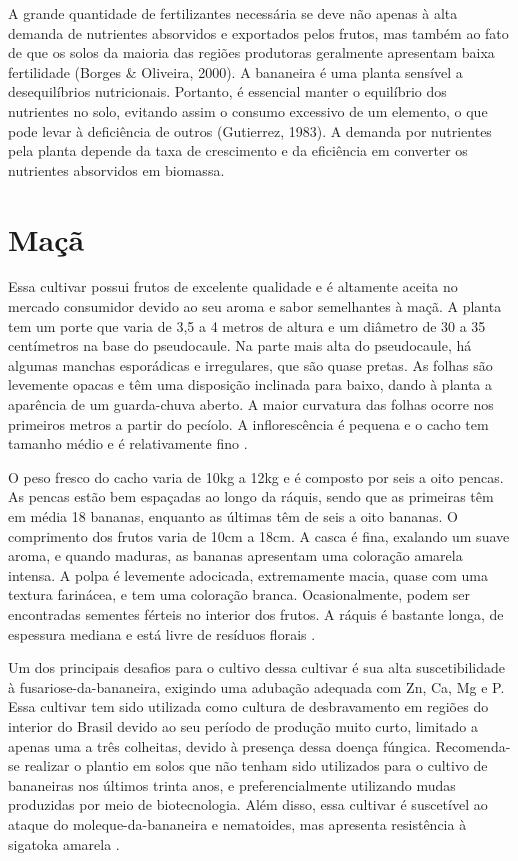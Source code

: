 A grande quantidade de fertilizantes necessária se deve não apenas à alta demanda de nutrientes absorvidos e exportados pelos frutos, mas também ao fato de que os solos da maioria das regiões produtoras geralmente apresentam baixa fertilidade (Borges \& Oliveira, 2000). A bananeira é uma planta sensível a desequilíbrios nutricionais. Portanto, é essencial manter o equilíbrio dos nutrientes no solo, evitando assim o consumo excessivo de um elemento, o que pode levar à deficiência de outros (Gutierrez, 1983). A demanda por nutrientes pela planta depende da taxa de crescimento e da eficiência em converter os nutrientes absorvidos em biomassa.

\section{Maçã}
Essa cultivar possui frutos de excelente qualidade e é altamente aceita no mercado consumidor devido ao seu aroma e sabor semelhantes à maçã. A planta tem um porte que varia de 3,5 a 4 metros de altura e um diâmetro de 30 a 35 centímetros na base do pseudocaule. Na parte mais alta do pseudocaule, há algumas manchas esporádicas e irregulares, que são quase pretas. As folhas são levemente opacas e têm uma disposição inclinada para baixo, dando à planta a aparência de um guarda-chuva aberto. A maior curvatura das folhas ocorre nos primeiros metros a partir do pecíolo. A inflorescência é pequena e o cacho tem tamanho médio e é relativamente fino \cite{cultivodebananeira}.

O peso fresco do cacho varia de 10kg a 12kg e é composto por seis a oito pencas. As pencas estão bem espaçadas ao longo da ráquis, sendo que as primeiras têm em média 18 bananas, enquanto as últimas têm de seis a oito bananas. O comprimento dos frutos varia de 10cm a 18cm. A casca é fina, exalando um suave aroma, e quando maduras, as bananas apresentam uma coloração amarela intensa. A polpa é levemente adocicada, extremamente macia, quase com uma textura farinácea, e tem uma coloração branca. Ocasionalmente, podem ser encontradas sementes férteis no interior dos frutos. A ráquis é bastante longa, de espessura mediana e está livre de resíduos florais \cite{cultivodebananeira}.

Um dos principais desafios para o cultivo dessa cultivar é sua alta suscetibilidade à fusariose-da-bananeira, exigindo uma adubação adequada com Zn, Ca, Mg e P. Essa cultivar tem sido utilizada como cultura de desbravamento em regiões do interior do Brasil devido ao seu período de produção muito curto, limitado a apenas uma a três colheitas, devido à presença dessa doença fúngica. Recomenda-se realizar o plantio em solos que não tenham sido utilizados para o cultivo de bananeiras nos últimos trinta anos, e preferencialmente utilizando mudas produzidas por meio de biotecnologia. Além disso, essa cultivar é suscetível ao ataque do moleque-da-bananeira e nematoides, mas apresenta resistência à sigatoka amarela \cite{cultivodebananeira}.

